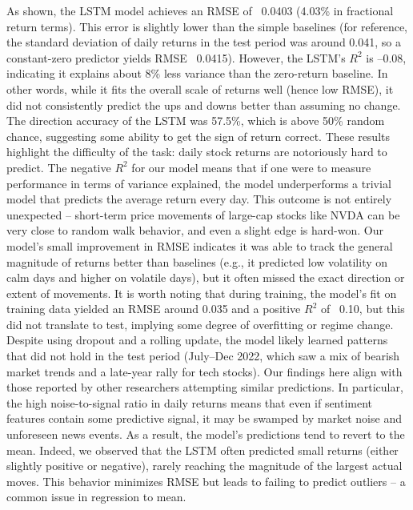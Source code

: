 \documentclass[conference]{IEEEtran}
\begin{document}
As shown, the LSTM model achieves an RMSE of ~0.0403 (4.03\% in fractional return terms). This error is slightly lower than the simple baselines (for reference, the standard deviation of daily returns in the test period was around 0.041, so a constant-zero predictor yields RMSE ~0.0415). However, the LSTM’s $R^2$ is --0.08, indicating it explains about 8\% less variance than the zero-return baseline. In other words, while it fits the overall scale of returns well (hence low RMSE), it did not consistently predict the ups and downs better than assuming no change. The direction accuracy of the LSTM was 57.5\%, which is above 50\% random chance, suggesting some ability to get the sign of return correct. These results highlight the difficulty of the task: daily stock returns are notoriously hard to predict. The negative $R^2$ for our model means that if one were to measure performance in terms of variance explained, the model underperforms a trivial model that predicts the average return every day. This outcome is not entirely unexpected -- short-term price movements of large-cap stocks like NVDA can be very close to random walk behavior, and even a slight edge is hard-won. Our model’s small improvement in RMSE indicates it was able to track the general magnitude of returns better than baselines (e.g., it predicted low volatility on calm days and higher on volatile days), but it often missed the exact direction or extent of movements. It is worth noting that during training, the model’s fit on training data yielded an RMSE around 0.035 and a positive $R^2$ of ~0.10, but this did not translate to test, implying some degree of overfitting or regime change. Despite using dropout and a rolling update, the model likely learned patterns that did not hold in the test period (July--Dec 2022, which saw a mix of bearish market trends and a late-year rally for tech stocks). Our findings here align with those reported by other researchers attempting similar predictions. In particular, the high noise-to-signal ratio in daily returns means that even if sentiment features contain some predictive signal, it may be swamped by market noise and unforeseen news events. As a result, the model’s predictions tend to revert to the mean. Indeed, we observed that the LSTM often predicted small returns (either slightly positive or negative), rarely reaching the magnitude of the largest actual moves. This behavior minimizes RMSE but leads to failing to predict outliers -- a common issue in regression to mean.
\end{document}
